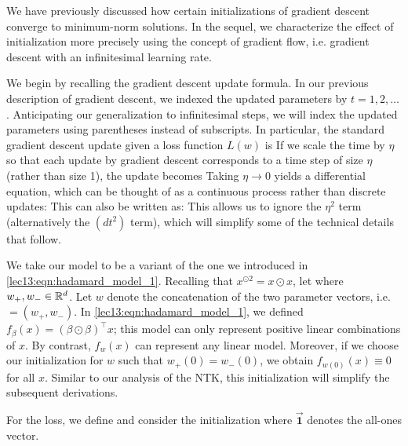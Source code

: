 

We have previously discussed how certain initializations of gradient descent converge to minimum-norm solutions. In the sequel, we characterize the effect of initialization more precisely using the concept of gradient flow, i.e. gradient descent with an infinitesimal learning rate.  

We begin by recalling the gradient descent update formula. In our previous description of gradient descent, we indexed the updated parameters by $t = 1,2,\dots$. Anticipating our generalization to infinitesimal steps, we will index the updated parameters using parentheses instead of subscripts. In particular, the standard gradient descent update given a loss function $L(w)$ is
If we scale the time by $\eta$ so that each update by gradient descent corresponds to a time step of size $\eta$ (rather than size 1), the update becomes
Taking $\eta \to 0$ yields a differential equation, which can be thought of as a continuous process rather than discrete updates:
This can also be written as:
This allows us to ignore the $\eta^2$ term (alternatively the $(dt^2)$ term), which will simplify some of the technical details that follow.

We take our model to be a variant of the one we introduced in \eqref{lec13:eqn:hadamard_model_1}. Recalling that $x^{\odot 2} = x \odot x$, let
where $w_+, w_- \in \mathbb R^d$. Let $w$ denote the concatenation of the two parameter vectors, i.e. $= (w_+, w_-)$.  In \eqref{lec13:eqn:hadamard_model_1}, we defined $f_\beta(x) = (\beta \odot \beta)^\top x$; this model can only represent positive linear combinations of $x$.  By contrast, $f_w(x)$ can represent any linear model. Moreover, if we choose our initialization for $w$ such that $w_+(0) = w_-(0)$, we obtain $f_{w(0)}(x) \equiv 0$ for all $x$. Similar to our analysis of the NTK, this initialization will simplify the subsequent derivations.

For the loss, we define
and consider the initialization
where $\vec{\mathbf{1}}$ denotes the all-ones vector.

